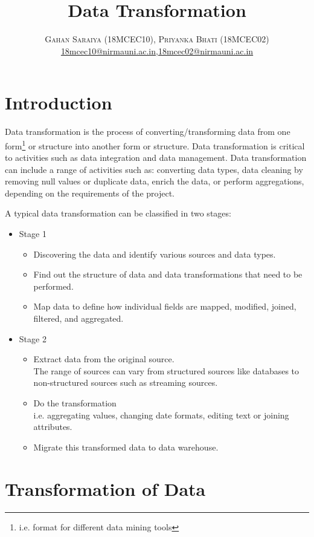 \documentclass[paper=letter, fontsize=12pt]{article}
\title{\vspace{-15mm}\fontsize{24pt}{10pt}\selectfont\textbf{Data Transformation}} %
\author{
\large
{\textsc{Gahan Saraiya (18MCEC10), Priyanka Bhati (18MCEC02) }}\\[2mm]
\normalsize \href{mailto:18mcec10@nirmauni.ac.in}{18mcec10@nirmauni.ac.in},\href{mailto:18mcec02@nirmauni.ac.in}{18mcec02@nirmauni.ac.in}\\[2mm] %
}
\date{}
\begin{document}
\maketitle %
\thispagestyle{fancy} %

\section{Introduction}
Data transformation is the process of converting/transforming data from one form\footnote{i.e. format for different data mining tools} or structure into another form or structure. Data transformation is critical to activities such as data integration and data management. Data transformation can include a range of activities such as: converting data types, data cleaning by removing null values or duplicate data, enrich the data, or perform aggregations, depending on the requirements of the project.

A typical data transformation can be classified in two stages:
\begin{itemize}
	\item Stage 1
		\begin{itemize}
			\item Discovering the data and identify various sources and data types.
			\item Find out the structure of data and data transformations that need to be performed.
			\item Map data to define how individual fields are mapped, modified, joined, filtered, and aggregated.
		\end{itemize}
	\item Stage 2
		\begin{itemize}
			\item Extract data from the original source. 
				\\ The range of sources can vary from structured sources like databases to non-structured sources such as streaming sources.
			\item Do the transformation
				\\ i.e. aggregating values, changing date formats, editing text or joining attributes.
			\item Migrate this transformed data to data warehouse.			
		\end{itemize}
\end{itemize}

\section{Transformation of Data}
\end{document}
